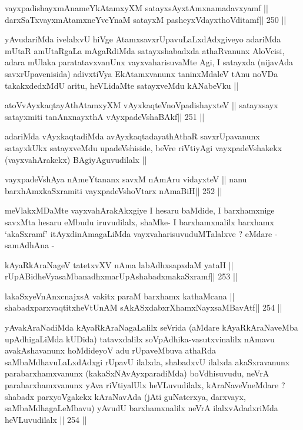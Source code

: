 \begin{shl}
vayxpadishayxmAnameYkAtamxyXM satayxsAyx\s\s tAmxnamadavxyamf ||
darxSaTxvayxmAtamxneYveYnaM satayxM pasheyxVdayxthoVditamf\hfill || 250 ||
\end{shl}

\begin{artha}
yAvudariMda ivelalxvU hiVge AtamxsavxrUpavuLaLxdAdxgiveyo adariMda
mUtaR amUtaRgaLa mAgaRdiMda satayxshabadxda athaRvanunx AloVcisi,
adara mUlaka paratatavxvanUnx vayxvaharisuvaMte Agi, I satayxda
(nijavAda savxrUpavenisida) adivxtiVya EkAtamxvanunx taninxMdaleV tAnu
noVDa takakxdedxMdU aritu, heVLidaMte satayxveMdu kANabeVku ||
\end{artha}

\begin{shl}
atoV\s vAyxkaqtayAthAtamxyXM vAyxkaqteVnoVpadishayxteV ||
satayxsayx satayxmiti tanAnxnayxthA vAyxpadeVshaBAkf\hfill || 251 ||
\end{shl}

\begin{artha}
adariMda vAyxkaqtadiMda avAyxkaqtadayathAthaR savxrUpavanunx
satayxkUkx satayxveMdu upadeVshiside, beVre riVtiyAgi vayxpadeVshakekx
(vayxvahArakekx) BAgiyAguvudilalx ||
\end{artha}

\begin{shl}
vayxpadeVshAya nAmeYtananx savxM nAmAru vidayxteV ||
nanu barxhAmxkaSxramiti vayxpadeVshoV\s tarx nAmaBiH\hfill || 252 ||
\end{shl}

\begin{artha}
meVlakxMDaMte vayxvahArakAkxgiye I hesaru baMdide, I barxhamxnige
savxMta hesaru eMbudu iruvudilalx, shaMke- I barxhamxnalilx barxhamx
`akaSxramf' itAyxdinAmagaLiMda vayxvaharisuvuduMTalalxve ? eMdare -
samAdhAna -
\end{artha}

\begin{shl}
kAyaRkAraNageV tatetxvXV nAma labAdhxsapxdaM yataH ||
rUpABidheVyasaMbanadhxmarUpAshabadxmakaSxramf\hfill || 253 ||
\end{shl}

\begin{shl}
lakaSxyeVnAnxcnajxsA vakitx paraM barxhamx kathaMcana ||
shabadxparxvaqtitxheVtUnAM sAkASxdabxrXhamxNayxsaMBavAtf\hfill || 254 ||
\end{shl}

\begin{artha}
yAvakAraNadiMda kAyaRkAraNagaLalilx seVrida (aMdare kAyaRkAraNaveMba
upAdhigaLiMda kUDida) tatavxdalilx soVpAdhika-vasutxvinalilx nAmavu
avakAshavanunx hoMdideyoV adu rUpaveMbuva athaRda
saMbaMdhavuLaLxdAdxgi rUpavU ilalxda, shabadxvU ilalxda akaSxravanunx
parabarxhamxvanunx (kakaSxNAvAyxparadiMda) boVdhisuvudu, neVrA
parabarxhamxvanunx yAva riVtiyalUlx heVLuvudilalx, kAraNaveVneMdare ?
shabadx parxyoVgakekx kAraNavAda (jAti guNaterxya, darxvayx,
saMbaMdhagaLeMbavu) yAvudU barxhamxnalilx neVrA ilalxvAdadxriMda
heVLuvudilalx || 254 ||
\end{artha}

